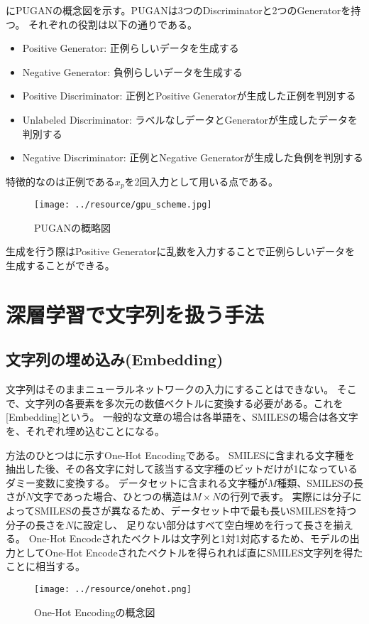 にPUGANの概念図を示す。PUGANは3つのDiscriminatorと2つのGeneratorを持つ。
それぞれの役割は以下の通りである。
\begin{itemize}
    \item Positive Generator: 正例らしいデータを生成する
    \item Negative Generator: 負例らしいデータを生成する
    \item Positive Discriminator: 正例とPositive Generatorが生成した正例を判別する
    \item Unlabeled Discriminator: ラベルなしデータとGeneratorが生成したデータを判別する
    \item Negative Discriminator: 正例とNegative Generatorが生成した負例を判別する
\end{itemize}
特徴的なのは正例である$x_p$を2回入力として用いる点である。
\begin{figure}[tbp]
    \centering
    \texttt{[image: ../resource/gpu\_scheme.jpg]}
    \caption{PUGANの概略図\cite{pugan}} \label{fig:gpu_scheme}
\end{figure}

生成を行う際はPositive Generatorに乱数を入力することで正例らしいデータを生成することができる。

\section{深層学習で文字列を扱う手法}

\subsection{文字列の埋め込み(Embedding)} \label{embedding}

文字列はそのままニューラルネットワークの入力にすることはできない。
そこで、文字列の各要素を多次元の数値ベクトルに変換する必要がある。これを[Embedding]という。
一般的な文章の場合は各単語を、SMILESの場合は各文字を、それぞれ埋め込むことになる。

方法のひとつはに示すOne-Hot Encodingである。
SMILESに含まれる文字種を抽出した後、その各文字に対して該当する文字種のビットだけが1になっているダミー変数に変換する。
データセットに含まれる文字種が$M$種類、SMILESの長さが$N$文字であった場合、ひとつの構造は$M\times N$の行列で表す。
実際には分子によってSMILESの長さが異なるため、データセット中で最も長いSMILESを持つ分子の長さを$N$に設定し、
足りない部分はすべて空白埋めを行って長さを揃える。
One-Hot Encodeされたベクトルは文字列と1対1対応するため、モデルの出力としてOne-Hot Encodeされたベクトルを得られれば直にSMILES文字列を得たことに相当する。
\begin{figure}[tbp]
    \centering
    \texttt{[image: ../resource/onehot.png]}
    \caption{One-Hot Encodingの概念図} \label{fig:onehot}
\end{figure}

